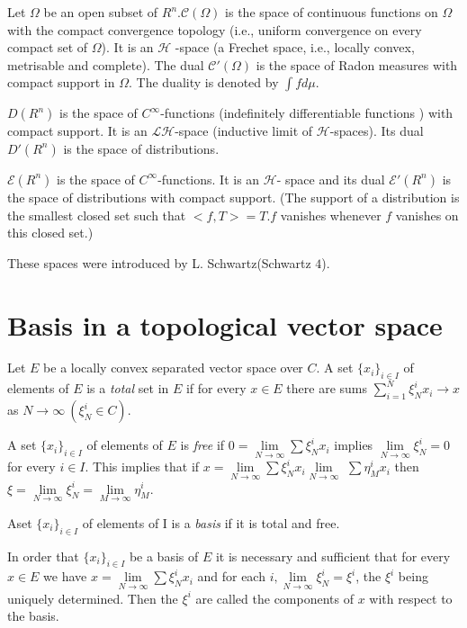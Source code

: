 Let $\Omega$ be an open subset of $R^n. \mathscr{C}(\Omega)$ is the
space of continuous functions on $\Omega$ with the compact convergence
topology (i.e., uniform convergence on every compact set of
$\Omega$). It is an $\mathscr{H}$ -space (a Frechet space,
i.e., locally convex, metrisable and complete). The dual $\mathscr{C}'
(\Omega)$ is the space of Radon measures with compact support in
$\Omega$. The duality is denoted by $\int f d \mu$. 

$D(R^n)$ is the space of $C^{\infty}$-functions (indefinitely
differentiable functions ) with compact support. It is an
$\mathscr{L}\mathscr{H}$-space (inductive limit of
$\mathscr{H}$-spaces). Its dual $D' (R^n)$ is the space of
distributions. 

$\mathscr{E} (R^n)$ is the space of $C^{\infty}$-functions. It is an
$\mathscr{H}$- space and its dual $\mathscr{E}' (R^n)$ is the space of
distributions with compact support. (The support of a distribution is
the smallest closed set such that $< f, T > = T. f$ vanishes whenever
$f$ vanishes on this closed set.) 

These spaces were introduced by L. Schwartz(Schwartz $4$).

\section{Basis in a topological vector space}\label{chap2:sec2}%

Let $E$ be a locally convex separated vector space over $C$. A set $\{
x_i \}_{ i \in I}$ of elements of $E$ is a \textit{ total } set in $E$
if for every $x \in E$ there are sums $\sum \limits^N_{i=1 } \xi^i_N
x_i \longrightarrow x$ as $N \to \infty ~(\xi^i_N \in C)$. 

A set $\{ x_i \}_{ i \in I}$ of elements of $E$ is \textit{ free} if
$0 = \lim \limits_{N \to \infty} \sum \xi^i_N x_i$ implies $\lim
\limits_{N \to \infty} \xi^i_N =0$ for every $i \in I$. This implies
that if $x= \lim \limits_{N \to \infty} \sum \xi^i_N x_i \lim
\limits_{N \to \infty}$ $\sum \eta^i_M x_i$ then $\xi = \lim\limits_{N
 \to \infty} \xi^i_N = \lim\limits_{M \to \infty} \eta^i_M$. 

A\pageoriginale set $\{ x_i \}_{ i \in I}$ of elements of I is a \textit{basis} if
it is total and free. 

\begin{remark*}
 In order that $\{ x_i \}_{ i \in I}$ be a basis of $E$ it is
 necessary and sufficient that for every $x \in E$ we have $x = \lim
 \limits_{N\to \infty} \sum \xi^i_N x_i$ and for each $i, \lim
 \limits_{N \to \infty} \xi^i_N = \xi^i$, the $\xi^i$ being uniquely
 determined. Then the $\xi^i$ are called the components of $x$ with
 respect to the basis. 
\end{remark*}

